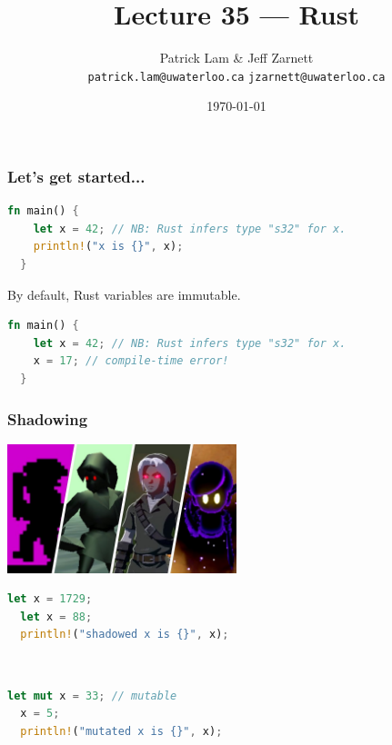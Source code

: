 

\title{Lecture 35 --- Rust }

\author{Patrick Lam \& Jeff Zarnett \\ \small \texttt{patrick.lam@uwaterloo.ca} \texttt{jzarnett@uwaterloo.ca}}
\date{\today}




\begin{frame}
  \titlepage

 \end{frame}



\begin{frame}[fragile]
\frametitle{Let's get started...}

\begin{lstlisting}[language=Rust]
  fn main() {
    let x = 42; // NB: Rust infers type "s32" for x.
    println!("x is {}", x);
  }
\end{lstlisting}
By default, Rust variables are \alert{immutable}.
\vspace*{-.5em}
\begin{lstlisting}[language=Rust]
  fn main() {
    let x = 42; // NB: Rust infers type "s32" for x.
    x = 17; // compile-time error!
  }
\end{lstlisting}

\end{frame}

\begin{frame}[fragile]
\frametitle{Shadowing}

\begin{center}
	\includegraphics[width=0.5\textwidth]{images/darklink.jpg}
\end{center}

\vspace*{-1.5em}
\begin{minipage}{.49\textwidth}
\begin{lstlisting}[language=Rust]
  let x = 1729;
  let x = 88;
  println!("shadowed x is {}", x);
\end{lstlisting}
\end{minipage}\
\begin{minipage}{.49\textwidth}
\begin{lstlisting}[language=Rust]
  let mut x = 33; // mutable
  x = 5;
  println!("mutated x is {}", x);
\end{lstlisting}
\end{minipage}

\end{frame}


